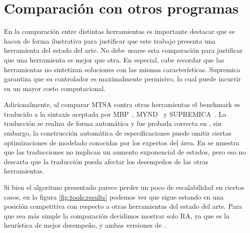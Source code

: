 \section{Comparación con otros programas}

En la comparación entre distintas herramientas es importante destacar que se hacen de forma ilustrativa para justificar que este trabajo presenta una herramienta del estado del arte. No debe usarse esta comparación para justificar que una herramienta es mejor que otra. En especial, cabe recordar que las herramientas no sintetizan soluciones con las mismas características. Supremica garantiza que su controlador es maximalmente permisivo, lo cual puede incurrir en un mayor costo computacional. 

Adicionalmente, al comparar MTSA contra otras herramientas el benchmark es traducido a la sintaxis aceptada por MBP~\cite{Gromyko:2006:TCS}, MYND~\cite{Mattmuller:2010:MYND} y SUPREMICA~\cite{Mohajerani:2014:Supremica}. La traducción se realiza de forma automática y fue probada correcta en \cite{Ciolek:2016:DCS}, sin embargo, la construcción automática de especificaciones puede omitir ciertas optimizaciones de modelado conocidas por los expertos del área. En \cite{Ciolek:2016:DCS} se muestra que las traducciones no implican un aumento exponencial de estados, pero eso no descarta que la traducción pueda afectar los desempeños de las otras herramientas.

Si bien el algoritmo presentado parece perder un poco de escalabilidad en ciertos casos, en la figura \ref{fig:tools:results} podemos ver que sigue estando en una posición competitiva con respecto a otras herramientas del estado del arte. Para que sea más simple la comparación decidimos mostrar solo RA, ya que es la heurística de mejor desempeño, y ambas versiones de \DCS. 

